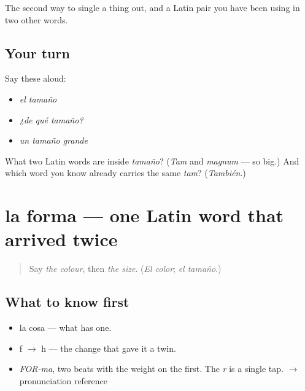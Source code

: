 \begin{grammarlens}[title={What you've built}]
The second way to single a thing out, and a Latin pair you have been using in two other words.
\end{grammarlens}

\subsection*{Your turn}
Say these aloud:

\begin{itemize}
\raggedright
  \item \emph{el tamaño}
  \item \emph{¿de qué tamaño?}
  \item \emph{un tamaño grande}
\end{itemize}

\begin{tcolorbox}[breakable,colback=teal!4,colframe=teal!35!black,title={Before you move on}]
What two Latin words are inside \emph{tamaño}? (\emph{Tam} and \emph{magnum} — so big.) And which word you know already carries the same \emph{tam}? (\emph{También}.)
\end{tcolorbox}
\section[la forma]{la forma — one Latin word that arrived twice}

\label{lesson:ES-C358-forma}



\begin{quote}
Say \emph{the colour}, then \emph{the size}. (\emph{El color}; \emph{el tamaño}.)
\end{quote}

\subsection*{What to know first}
\begin{itemize}
\raggedright
  \item la cosa — what has one.
  \item f $\to$ h — the change that gave it a twin.
\end{itemize}

\begin{sounds}
\begin{itemize}
\raggedright
  \item \emph{FOR-ma}, two beats with the weight on the first. The \emph{r} is a single tap. $\to$ pronunciation reference
\end{itemize}
\end{sounds}

